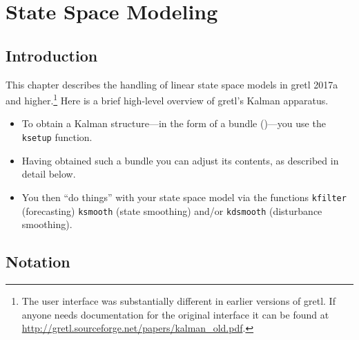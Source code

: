 \newcommand{\obsvec}{y}
\newcommand{\obsymat}{Z}
\newcommand{\obsx}{x}
\newcommand{\obsxmat}{B}
\newcommand{\obsdist}{u}
\newcommand{\obsvar}{R}

\newcommand{\statevec}{\alpha}
\newcommand{\statecvar}{P}
\newcommand{\statemat}{T}
\newcommand{\strdist}{w}
\newcommand{\statevar}{Q}
\newcommand{\gain}{K}
\newcommand{\statemu}{\mu}

\newcommand{\altstatevar}{H}
\newcommand{\altobsvar}{G}
\newcommand{\alldist}{\varepsilon}

\newcommand{\prederr}{v}
\newcommand{\predvar}{F}

\newcommand{\myvec}{\mbox{vec}}
\newcommand{\myvech}{\mbox{vech}}

\chapter{State Space Modeling}
\label{chap:kalman}

\section{Introduction}
\label{sec:amble}

This chapter describes the handling of linear state space models in
gretl 2017a and higher.\footnote{The user interface was substantially
  different in earlier versions of gretl. If anyone needs
  documentation for the original interface it can be found at
  \url{http://gretl.sourceforge.net/papers/kalman_old.pdf}.}
Here is a brief high-level overview of gretl's Kalman apparatus.
%
\begin{itemize}
\item To obtain a Kalman structure---in the form of a bundle ()---you
  use the \texttt{ksetup} function.
\item Having obtained such a bundle you can adjust its contents, as
  described in detail below.
\item You then ``do things'' with your state space model via the
  functions \texttt{kfilter} (forecasting) \texttt{ksmooth} (state
  smoothing) and/or \texttt{kdsmooth} (disturbance smoothing).
\end{itemize}

\section{Notation}

